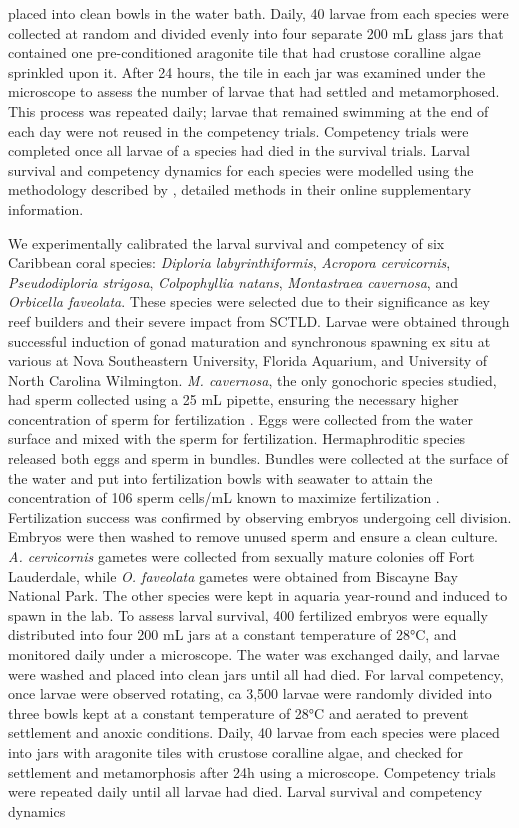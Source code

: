 \documentclass[preprint,12pt,authoryear]{elsarticle}
\begin{document}
placed into clean bowls in the water bath. Daily, 40 larvae from each species were collected at random and divided evenly into four separate 200 mL glass jars that contained one pre-conditioned aragonite tile that had crustose coralline algae sprinkled upon it. After 24 hours, the tile in each jar was examined under the microscope to assess the number of larvae that had settled and metamorphosed. This process was repeated daily; larvae that remained swimming at the end of each day were not reused in the competency trials. Competency trials were completed once all larvae of a species had died in the survival trials. Larval survival and competency dynamics for each species were modelled using the methodology described by \cite{figueiredo2022global}, detailed methods in their online supplementary information.

We experimentally calibrated the larval survival and competency of six Caribbean coral species: \textit{Diploria labyrinthiformis}, \textit{Acropora cervicornis}, \textit{Pseudodiploria strigosa}, \textit{Colpophyllia natans}, \textit{Montastraea cavernosa}, and \textit{Orbicella faveolata}. These species were selected due to their significance as key reef builders and their severe impact from SCTLD. Larvae were obtained through successful induction of gonad maturation and synchronous spawning ex situ at various at Nova Southeastern University, Florida Aquarium, and University of North Carolina Wilmington. \textit{M. cavernosa}, the only gonochoric species studied, had sperm collected using a 25 mL pipette, ensuring the necessary higher concentration of sperm for fertilization \citep{fogarty2012asymmetric, fogarty2012weak, dela2020optimising}. Eggs were collected from the water surface and mixed with the sperm for fertilization. Hermaphroditic species released both eggs and sperm in bundles. Bundles were collected at the surface of the water and put into fertilization bowls with seawater to attain the concentration of 106 sperm cells/mL known to maximize fertilization \citep{fogarty2012asymmetric, fogarty2012weak, dela2020optimising}. Fertilization success was confirmed by observing embryos undergoing cell division. Embryos were then washed to remove unused sperm and ensure a clean culture. \textit{A. cervicornis} gametes were collected from sexually mature colonies off Fort Lauderdale, while \textit{O. faveolata} gametes were obtained from Biscayne Bay National Park. The other species were kept in aquaria year-round and induced to spawn in the lab. To assess larval survival, 400 fertilized embryos were equally distributed into four 200 mL jars at a constant temperature of 28°C, and monitored daily under a microscope. The water was exchanged daily, and larvae were washed and placed into clean jars until all had died. For larval competency, once larvae were observed rotating, ca 3,500 larvae were randomly divided into three bowls kept at a constant temperature of 28°C and aerated to prevent settlement and anoxic conditions. Daily, 40 larvae from each species were placed into jars with aragonite tiles with crustose coralline algae, and checked for settlement and metamorphosis after 24h using a microscope. Competency trials were repeated daily until all larvae had died. Larval survival and competency dynamics 
\end{document}
